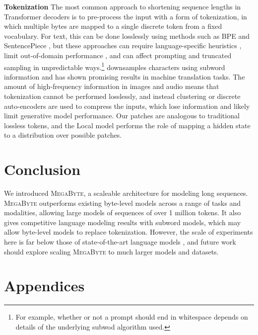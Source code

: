 \documentclass{article}
\newcommand{\fastslow}[0]{\textsc{MegaByte}\xspace}
\newcommand{\megabyte}[0]{\fastslow}
\theoremstyle{plain}
\theoremstyle{definition}
\theoremstyle{remark}
\begin{document}
\textbf{Tokenization} The most common approach to shortening sequence lengths in Transformer decoders is to pre-process the input with a form of tokenization, in which multiple bytes are mapped to a single discrete token from a fixed vocabulary. For text, this can be done losslessly using methods such as BPE \citep{bpe} and SentencePiece \citep{sentencepiece}, but these approaches can require language-specific heuristics \citep{gpt2}, limit out-of-domain performance \citep{sharami2023systematic}, and can affect prompting and truncated sampling in unpredictable ways.\footnote{For example, whether or not a prompt should end in whitespace depends on details of the underlying subwod algorithm used.} \citet{subword} downsamples characters using subword information and has shown promising results in machine translation tasks. The amount of high-frequency information in images and audio means that tokenization cannot be performed losslessly, and instead clustering \citep{hubert} or discrete auto-encoders \citep{dalle} are used to compress the inputs, which lose information and likely limit generative model performance. Our patches are analogous to traditional lossless tokens, and the Local model performs the role of mapping a hidden state to a distribution over possible patches.

\section{Conclusion}
We introduced \megabyte, a scaleable architecture for modeling long sequences.
\megabyte outperforms existing byte-level models across a range of tasks and modalities, allowing large models of sequences of over 1 million tokens.
It also gives competitive language modeling results with subword models, which may allow byte-level models to replace tokenization.
However, the scale of experiments here is far below those of state-of-the-art language models \citep{gpt3}, and future work should explore scaling \megabyte to much larger models and datasets.




\newpage
\appendix
\onecolumn
\section{Appendices}
\label{sec:appendix}
\end{document}
